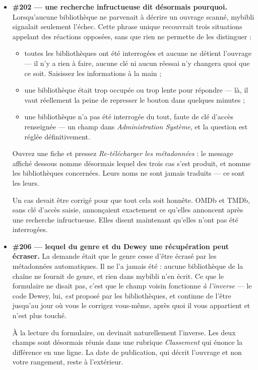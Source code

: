\begin{itemize}
  \item \textbf{\#202 \string— une recherche infructueuse dit désormais
        pourquoi.} Lorsqu'aucune bibliothèque ne parvenait à décrire un
        ouvrage scanné, mybibli signalait seulement l'échec. Cette
        phrase unique recouvrait trois situations appelant des réactions
        opposées, sans que rien ne permette de les distinguer :

        \begin{itemize}
          \item toutes les bibliothèques ont été interrogées et aucune
                ne détient l'ouvrage \string— il n'y a rien à faire,
                aucune clé ni aucun réessai n'y changera quoi que ce
                soit. Saisissez les informations à la main ;
          \item une bibliothèque était trop occupée ou trop lente pour
                répondre \string— là, il vaut réellement la peine de
                represser le bouton dans quelques minutes ;
          \item une bibliothèque n'a pas été interrogée du tout, faute
                de clé d'accès renseignée \string— un champ dans
                \emph{Administration \textrightarrow{} Système}, et la
                question est réglée définitivement.
        \end{itemize}

        Ouvrez une fiche et pressez \emph{Re-télécharger les
        métadonnées} : le message affiché dessous nomme désormais lequel
        des trois cas s'est produit, et nomme les bibliothèques
        concernées. Leurs noms ne sont jamais traduits \string— ce sont
        les leurs.

        Un cas devait être corrigé pour que tout cela soit honnête. OMDb
        et TMDb, sans clé d'accès saisie, annonçaient exactement ce
        qu'elles annoncent après une recherche infructueuse. Elles
        disent maintenant qu'elles n'ont pas été interrogées.
  \item \textbf{\#206 \string— lequel du genre et du Dewey une
        récupération peut écraser.} La demande était que le genre cesse
        d'être écrasé par les métadonnées automatiques. Il ne l'a jamais
        été : aucune bibliothèque de la chaîne ne fournit de genre, et
        rien dans mybibli n'en écrit. Ce que le formulaire ne disait pas,
        c'est que le champ voisin fonctionne \emph{à l'inverse} \string—
        le code Dewey, lui, \emph{est} proposé par les bibliothèques, et
        continue de l'être jusqu'au jour où vous le corrigez vous-même,
        après quoi il vous appartient et n'est plus touché.

        À la lecture du formulaire, on devinait naturellement l'inverse.
        Les deux champs sont désormais réunis dans une rubrique
        \emph{Classement} qui énonce la différence en une ligne. La date
        de publication, qui décrit l'ouvrage et non votre rangement,
        reste à l'extérieur.
\end{itemize}

